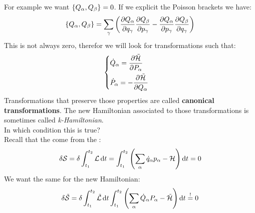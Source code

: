 For example we want $\pb{Q_{\alpha}}{Q_{\beta}} = 0$. If we explicit the Poisson brackets we have:
\begin{equation}
    \pb{Q_{\alpha}}{Q_{\beta}} = \bigsum_{\gamma} \left(\pdv{Q_{\alpha}}{q_{\gamma}} \pdv{Q_{\beta}}{p_{\gamma}} - \pdv{Q_{\alpha}}{p_{\gamma}} \pdv{Q_{\beta}}{q_{\gamma}} \right)
\end{equation}
This is not always zero, therefor we will look for transformations such that:
\begin{equation}
    \begin{cases}
        \dot{Q}_{\alpha} = \pdv{\tilde{\hamfun}}{P_{\alpha}} \\[8pt]
        \dot{P}_{\alpha} = -\pdv{\tilde{\hamfun}}{Q_{\alpha}}
    \end{cases}
\end{equation}
Transformations that preserve those properties are called \textbf{canonical transformations}. The new Hamiltonian associated to those transformations is sometimes called \textit{k-Hamiltonian}.\\
In which condition this is true?\\
Recall that the \hamiltonref\;come from the \hpquotemath :
\begin{equation}
    \delta \mathcal{S} = \delta \int_{t_1}^{t_2}\mathcal{L} \dd{t} = \int_{t_1}^{t_2} \left(\displaystyle\sum_{\alpha}\dot{q}_{\alpha}p_{\alpha} - \mathcal{H}\right) \dd{t} =0
\end{equation}
We want the same for the new Hamiltonian:
\begin{equation}
    \delta \tilde{\mathcal{S}} = \delta \int_{t_1}^{t_2}\tilde{\mathcal{L}} \dd{t} \int_{t_1}^{t_2} \left(\displaystyle\sum_{\alpha}\dot{Q}_{\alpha}P_{\alpha} - \tilde{\mathcal{H}}\right) \dd{t} \overset{!}{=} 0
\end{equation}
